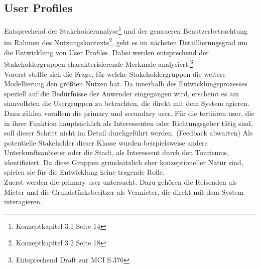 \subsection{User Profiles}
Entsprechend der Stakeholderanalyse\footnote{Konzeptkapitel 3.1 Seite 14} und der genaueren Benutzerbetrachtung im Rahmen des Nutzungskontexts\footnote{Konzeptkapitel 3.2 Seite 18}, geht es im nächsten Detaillierungsgrad um die Entwicklung von User Profiles. Dabei werden entsprechend der Stakeholdergruppen charakterisierende Merkmale analysiert.\footnote{Entsprechend Draft zur MCI S.376}\\
Vorerst stellte sich die Frage, für welche Stakeholdergruppen die weitere Modellierung den größten Nutzen hat. Da innerhalb des Entwicklungsprozesses speziell auf die Bedürfnisse der Anwender eingegangen wird, erscheint es am sinnvollsten die Usergruppen zu betrachten, die direkt mit dem System agieren. Dazu zählen vorallem die primary und secundary user. Für die tertiären user, die in ihrer Funktion hauptsächlich als Interessenten oder Richtungsgeber tätig sind, soll dieser Schritt nicht im Detail durchgeführt werden. (Feedback abwarten) Als potentielle Stakeholder dieser Klasse wurden beispielsweise andere Unterkunftsanbieter oder die Stadt, als Interessent durch den Tourismus, identifiziert. Da diese Gruppen grundsätzlich eher konzeptioneller Natur sind, spielen sie für die Entwicklung keine tragende Rolle.\\

Zuerst werden die primary user untersucht. Dazu gehören die Reisenden als Mieter und die Grundstücksbesitzer als Vermieter, die direkt mit dem System interagieren.

\newpage
